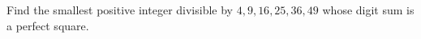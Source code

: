 Find the smallest positive integer divisible by $4,9,16,25,36,49$ whose digit sum is a perfect square.
